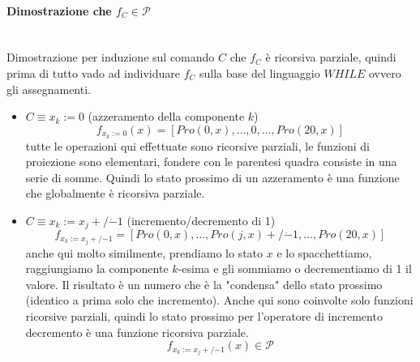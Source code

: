 \documentclass{article}
\begin{document}
\paragraph{Dimostrazione che $f_C\in\mathcal{P}$}\mbox{}\\
Dimostrazione per induzione sul comando $C$ che $f_C$ è ricorsiva parziale, quindi prima di
tutto vado ad individuare $f_C$ sulla base del linguaggio $WHILE$ ovvero gli assegnamenti.
\begin{itemize}
    \item $C\equiv x_k :=0$ (azzeramento della componente $k$)
          $$f_{x_k:=0}(x)=[Pro(0,x),\dots,0,\dots,Pro(20,x)]$$
          tutte le operazioni qui effettuate sono ricorsive parziali, le funzioni di proiezione
          sono elementari, fondere con le parentesi quadra consiste in una serie di somme. Quindi
          lo stato prossimo di un azzeramento è una funzione che globalmente è ricorsiva parziale.

    \item $C\equiv x_k:=x_j +/\dot{-}1$ (incremento/decremento di 1)
          $$f_{x_k:=x_j +/\dot{-}1}=[Pro(0,x),\dots,Pro(j,x)+/\dot{-}1,\dots,Pro(20,x)]$$
          anche qui molto similmente,
          prendiamo lo stato $x$ e lo spacchettiamo, raggiungiamo la componente $k$-esima e gli
          sommiamo o decrementiamo di 1 il valore. Il risultato è un numero che è la "condensa"
          dello stato prossimo (identico a prima solo che incremento). Anche qui sono coinvolte
          solo funzioni ricorsive parziali, quindi lo stato prossimo per l'operatore di incremento
          decremento è una funzione ricorsiva parziale.
          $$f_{x_k:=x_j +/\dot{-}1}(x)\in\mathcal{P}$$
\end{itemize}
\end{document}
